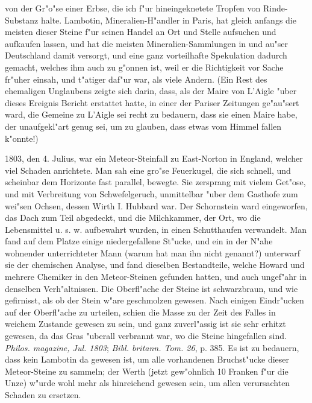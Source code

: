 \documentclass[a4paper, 11pt, oneside, polutonikogreek, german]{article}
\begin{document}
von der Gr"o"se einer Erbse, die ich f"ur hineingeknetete Tropfen von Rinde-Substanz halte. Lambotin, Mineralien-H"andler in Paris, hat gleich anfangs die meisten dieser Steine f"ur seinen Handel an Ort und Stelle aufsuchen und aufkaufen lassen, und hat die meisten Mineralien-Sammlungen in und au"ser Deutschland damit versorgt, und eine ganz vorteilhafte Spekulation dadurch gemacht, welches ihm auch zu g"onnen ist, weil er die Richtigkeit vor Sache fr"uher einsah, und t"atiger daf"ur war, als viele Andern. (Ein Rest des ehemaligen Unglaubens zeigte sich darin, dass, als der Maire von L'Aigle "uber dieses Ereignis Bericht erstattet hatte, in einer der Pariser Zeitungen ge"au"sert ward, die Gemeine zu L'Aigle sei recht zu bedauern, dass sie einen Maire habe, der unaufgekl"art genug sei, um zu glauben, dass etwas vom Himmel fallen k"onnte!)

1803, den 4. Julius, war ein Meteor-Steinfall zu East-Norton in England, welcher viel Schaden anrichtete. Man sah eine gro"se Feuerkugel, die sich schnell, und scheinbar dem Horizonte fast parallel, bewegte. Sie zersprang mit vielem Get"ose, und mit Verbreitung von Schwefelgeruch, unmittelbar "uber dem Gasthofe zum wei"sen Ochsen, dessen Wirth I. Hubbard war. Der Schornstein ward eingeworfen, das Dach zum Teil abgedeckt, und die Milchkammer, der Ort, wo die Lebensmittel u. s. w. aufbewahrt wurden, in einen Schutthaufen verwandelt. Man fand auf dem Platze einige niedergefallene St"ucke, und ein in der N"ahe wohnender unterrichteter Mann (warum hat man ihn nicht genannt?) unterwarf sie der chemischen Analyse, und fand dieselben Bestandteile, welche Howard und mehrere Chemiker in den Meteor-Steinen gefunden hatten, und auch ungef"ahr in denselben Verh"altnissen. Die Oberfl"ache der Steine ist schwarzbraun, und wie gefirnisst, als ob der Stein w"are geschmolzen gewesen. Nach einigen Eindr"ucken auf der Oberfl"ache zu urteilen, schien die Masse zu der Zeit des Falles in weichem Zustande gewesen zu sein, und ganz zuverl"assig ist sie sehr erhitzt gewesen, da das Gras "uberall verbrannt war, wo die Steine hingefallen sind. \emph{Philos. magazine, Jul. 1803}; \emph{Bibl. britann. Tom. 26}, p. 385. Es ist zu bedauern, dass kein Lambotin da gewesen ist, um alle vorhandenen Bruchst"ucke dieser Meteor-Steine zu sammeln; der Werth (jetzt gew"ohnlich 10 Franken f"ur die Unze) w"urde wohl mehr als hinreichend gewesen sein, um allen verursachten Schaden zu ersetzen.
\end{document}
